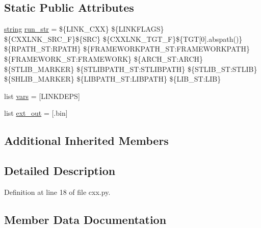 \subsection*{Static Public Attributes}
\begin{DoxyCompactItemize}
\item 
\hyperlink{test__lib_f_l_a_c_2format_8c_ab02026ad0de9fb6c1b4233deb0a00c75}{string} \hyperlink{classwaflib_1_1_tools_1_1cxx_1_1cxxprogram_a8a9585243550a2606c05e99ae5187c41}{run\+\_\+str} = \textquotesingle{}\$\{L\+I\+N\+K\+\_\+\+C\+XX\} \$\{L\+I\+N\+K\+F\+L\+A\+GS\} \$\{C\+X\+X\+L\+N\+K\+\_\+\+S\+R\+C\+\_\+F\}\$\{S\+RC\} \$\{C\+X\+X\+L\+N\+K\+\_\+\+T\+G\+T\+\_\+F\}\$\{T\+GT\mbox{[}0\mbox{]}.abspath()\} \$\{R\+P\+A\+T\+H\+\_\+\+S\+T\+:\+R\+P\+A\+TH\} \$\{F\+R\+A\+M\+E\+W\+O\+R\+K\+P\+A\+T\+H\+\_\+\+S\+T\+:\+F\+R\+A\+M\+E\+W\+O\+R\+K\+P\+A\+TH\} \$\{F\+R\+A\+M\+E\+W\+O\+R\+K\+\_\+\+S\+T\+:\+F\+R\+A\+M\+E\+W\+O\+RK\} \$\{A\+R\+C\+H\+\_\+\+S\+T\+:\+A\+R\+CH\} \$\{S\+T\+L\+I\+B\+\_\+\+M\+A\+R\+K\+ER\} \$\{S\+T\+L\+I\+B\+P\+A\+T\+H\+\_\+\+S\+T\+:\+S\+T\+L\+I\+B\+P\+A\+TH\} \$\{S\+T\+L\+I\+B\+\_\+\+S\+T\+:\+S\+T\+L\+IB\} \$\{S\+H\+L\+I\+B\+\_\+\+M\+A\+R\+K\+ER\} \$\{L\+I\+B\+P\+A\+T\+H\+\_\+\+S\+T\+:\+L\+I\+B\+P\+A\+TH\} \$\{L\+I\+B\+\_\+\+S\+T\+:\+L\+IB\}\textquotesingle{}
\item 
list \hyperlink{classwaflib_1_1_tools_1_1cxx_1_1cxxprogram_a151587343ba3422c015c899a39427f6a}{vars} = \mbox{[}\textquotesingle{}L\+I\+N\+K\+D\+E\+PS\textquotesingle{}\mbox{]}
\item 
list \hyperlink{classwaflib_1_1_tools_1_1cxx_1_1cxxprogram_a389ec82e90a9be0be75b449b32f733ce}{ext\+\_\+out} = \mbox{[}\textquotesingle{}.bin\textquotesingle{}\mbox{]}
\end{DoxyCompactItemize}
\subsection*{Additional Inherited Members}


\subsection{Detailed Description}


Definition at line 18 of file cxx.\+py.



\subsection{Member Data Documentation}
